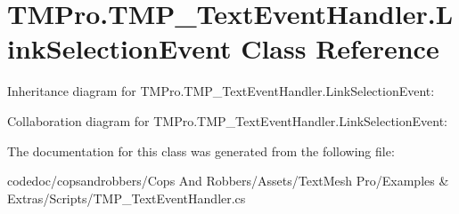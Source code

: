 \hypertarget{classTMPro_1_1TMP__TextEventHandler_1_1LinkSelectionEvent}{}\section{T\+M\+Pro.\+T\+M\+P\+\_\+\+Text\+Event\+Handler.\+Link\+Selection\+Event Class Reference}
\label{classTMPro_1_1TMP__TextEventHandler_1_1LinkSelectionEvent}


Inheritance diagram for T\+M\+Pro.\+T\+M\+P\+\_\+\+Text\+Event\+Handler.\+Link\+Selection\+Event\+:


Collaboration diagram for T\+M\+Pro.\+T\+M\+P\+\_\+\+Text\+Event\+Handler.\+Link\+Selection\+Event\+:


The documentation for this class was generated from the following file\+:\begin{DoxyCompactItemize}
\item 
codedoc/copsandrobbers/\+Cops And Robbers/\+Assets/\+Text\+Mesh Pro/\+Examples \& Extras/\+Scripts/T\+M\+P\+\_\+\+Text\+Event\+Handler.\+cs\end{DoxyCompactItemize}
